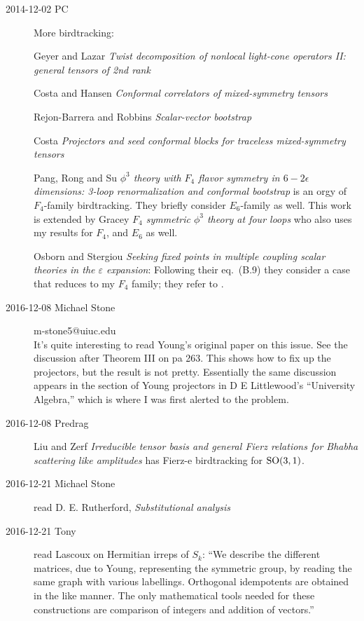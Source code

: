 \begin{description}
\item[2014-12-02 PC] More birdtracking:

Geyer and Lazar
{\em Twist decomposition of nonlocal light-cone operators
{II:} general tensors of 2nd rank}

Costa and Hansen
{\em Conformal correlators of mixed-symmetry tensors}

Rejon-Barrera and Robbins {\em Scalar-vector bootstrap}

Costa \etal{}
{\em Projectors and seed conformal blocks for traceless mixed-symmetry tensors}

Pang, Rong  and Su {\em {$\phi^3$} theory with {$F_4$} flavor
symmetry in {$6-2\epsilon$} dimensions: 3-loop renormalization and conformal
bootstrap} is an orgy of $F_4$-family birdtracking. They briefly consider
$E_6$-family as well.
This work is extended by
Gracey {\em {$F_4$} symmetric {$\phi^3$} theory at four
loops} who also uses my results for $F_4$, and $E_6$ as well.

Osborn and Stergiou {\em Seeking fixed points in multiple
coupling scalar theories in the $\varepsilon$ expansion}:
Following their eq.~(B.9) they consider a case that reduces to my $F_4$
family; they refer to .

\item[2016-12-08 Michael Stone] m-stone5@uiuc.edu
\\
It's quite interesting to read Young's original paper on this
issue. See the discussion after Theorem III on pa 263. This shows how to fix
up the projectors, but the result is not pretty. Essentially the same
discussion appears in the section of Young projectors in D E Littlewood's
``University Algebra,'' which is where I was first alerted to the problem.

\item[2016-12-08 Predrag]
Liu and Zerf {\em Irreducible tensor basis and general {Fierz}
relations for {Bhabha} scattering like amplitudes} has Fierz-e birdtracking for
$\textrm{SO}(3,1)$.

\item[2016-12-21 Michael Stone] read
D. E. Rutherford, {\em Substitutional analysis}

\item[2016-12-21 Tony] read Lascoux on Hermitian irreps of
$S_k$: ``We describe the different matrices, due to Young, representing
the symmetric group, by reading the same graph with various labellings.
Orthogonal idempotents are obtained in the like manner. The only
mathematical tools needed for these constructions are comparison of
integers and addition of vectors.''


\end{description}
